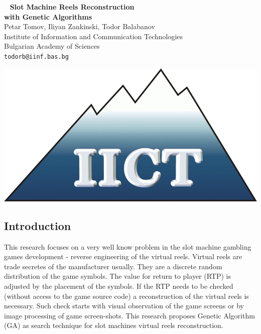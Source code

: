\documentclass[a0,portrait,25pt]{sciposter}
\begin{document}
\pagecolor{LightGray}

\begin{mdframed}[backgroundcolor=white,roundcorner=4pt,shadow=true,linewidth=1pt]
\begin{minipage}[b]{1.44  \linewidth}
\begin{multicols}{2}
\
\color{DimGray}
\Huge \textbf{Slot Machine Reels Reconstruction \\ with Genetic Algorithms} \\
\huge {Petar Tomov, Iliyan Zankinski, Todor Balabanov} \\ [0.5cm] 
\huge Institute of Information and Communication Technologies \\  Bulgarian Academy of Sciences \\ [0.4cm]
\Large \texttt{todorb@iinf.bas.bg}

\includegraphics[width=20cm]{logo-iict-en}
\end{multicols}
\end{minipage}
\end{mdframed}

\vspace{0.5cm}

\begin{mdframed}[backgroundcolor=white,roundcorner=4pt,shadow=true,linewidth=1pt]
\color{Black}
\section*{Introduction}
This research focuses on a very well know problem in the slot machine gambling games development - reverse engineering of the virtual reels. Virtual reels are trade secretes of the manufacturer usually. They are a discrete random distribution of the game symbols. The value for return to player (RTP) is adjusted by the placement of the symbols. If the RTP needs to be checked (without access to the game source code) a reconstruction of the virtual reels is necessary. Such check starts with visual observation of the game screens or by image processing of game screen-shots. This research proposes Genetic Algorithm (GA) as search technique for slot machines virtual reels reconstruction.
\end{mdframed}
\end{document}
